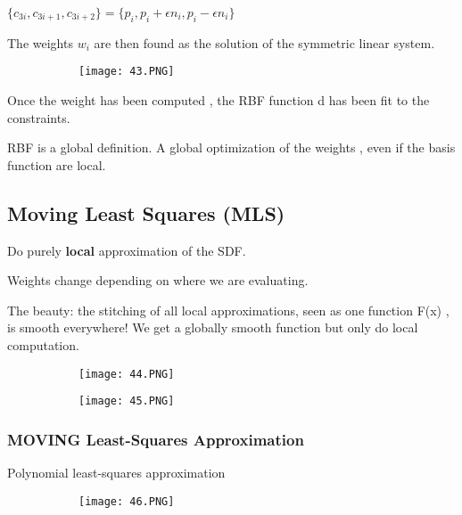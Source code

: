 \documentclass{article}
\begin{document}
$\{c_{3i},c_{3i+1},c_{3i+2}\} = \{p_i, p_i + \epsilon n_i,p_i - \epsilon n_i\}$

The weights $w_i$ are then found as the solution of the symmetric linear system.

\begin{figure}[ht!]
  \centering
  \begin{subfigure}[b]{0.7\linewidth}
    \texttt{[image: 43.PNG]}
  \end{subfigure}
\end{figure}

Once the weight has been computed , the RBF function d has been fit to the constraints.

RBF is a global definition. A global optimization of the weights , even if the basis function are local.


\subsection{Moving Least Squares (MLS)}

Do purely \textbf{local} approximation of the SDF.

Weights change depending on where we are evaluating.

The beauty: the stitching of all local approximations, seen as one function F(x) , is smooth everywhere! We get a globally smooth function but only do local computation.

\begin{figure}[ht!]
  \centering
  \begin{subfigure}[b]{0.39\linewidth}
    \texttt{[image: 44.PNG]}
    \caption{}
  \end{subfigure}
     \begin{subfigure}[b]{0.39\textwidth}
         \centering
         \texttt{[image: 45.PNG]}
     \end{subfigure}
\end{figure}

\subsubsection{MOVING Least-Squares Approximation}

Polynomial least-squares approximation

\begin{figure}[ht!]
  \centering
  \begin{subfigure}[b]{0.7\linewidth}
    \texttt{[image: 46.PNG]}
  \end{subfigure}
\end{figure}
\end{document}
